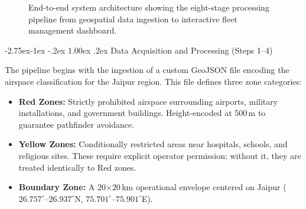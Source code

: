 \documentclass[11pt,a4paper,twocolumn]{article}
\makeatletter
\renewcommand{\subsection}{\@startsection{subsection}{2}{\z@}%
  {-2.75ex\@plus -1ex \@minus -.2ex}%
  {1.00ex \@plus .2ex}%
  {\normalfont\normalsize\bfseries\itshape}}
\makeatother
\begin{document}
\begin{figure}[!t]
{%
}
\caption{End-to-end system architecture showing the eight-stage processing pipeline from geospatial data ingestion to interactive fleet management dashboard.}
\label{fig:architecture}
\end{figure}

\subsection{Data Acquisition and Processing (Steps 1--4)}

The pipeline begins with the ingestion of a custom GeoJSON file encoding the airspace classification for the Jaipur region. This file defines three zone categories:

\begin{itemize}[leftmargin=*]
    \item \textbf{Red Zones:} Strictly prohibited airspace surrounding airports, military installations, and government buildings. Height-encoded at 500\,m to guarantee pathfinder avoidance.
    \item \textbf{Yellow Zones:} Conditionally restricted areas near hospitals, schools, and religious sites. These require explicit operator permission; without it, they are treated identically to Red zones.
    \item \textbf{Boundary Zone:} A 20$\times$20\,km operational envelope centered on Jaipur ($26.757^\circ$--$26.937^\circ$N, $75.701^\circ$--$75.901^\circ$E).
\end{itemize}
\end{document}
